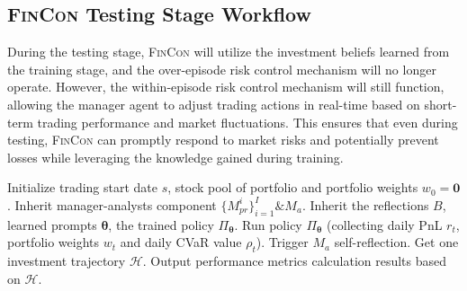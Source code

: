 
\newpage
\subsection{\textsc{FinCon} Testing Stage Workflow}
\label{Testing_Algo}
During the testing stage, \textsc{FinCon} will utilize the investment beliefs learned from the training stage, and the over-episode risk control mechanism will no longer operate. However, the within-episode risk control mechanism will still function, allowing the manager agent to adjust trading actions in real-time based on short-term trading performance and market fluctuations. This ensures that even during testing, \textsc{FinCon} can promptly respond to market risks and potentially prevent losses while leveraging the knowledge gained during training.

\label{alg:test_phase}
\begin{algorithm}[ht]
\caption{Testing Stage Algorithm of \textsc{FinCon}}
\begin{algorithmic}
\footnotesize{
\STATE Initialize trading start date $s$, stock pool of portfolio and portfolio weights $w_0=\textbf{0}$.
\STATE Inherit manager-analysts component $\{M_{pr}^i\}^{I}_{i=1} \& M_a$.
\STATE Inherit the reflections $B$, learned prompts $\bm{\theta}$, the trained policy $\Pi_{\bm{\theta}}$.
    \STATE Run policy $\Pi_{\bm{\theta}}$ (collecting daily PnL $r_t$, portfolio weights $w_t$ and daily CVaR value $\rho_t$).
        \STATE Trigger $M_a$ self-reflection.
    \ENDIF
    \STATE Get one investment trajectory $\mathcal{H}$.
\ENDFOR
\STATE Output performance metrics calculation results based on $\mathcal{H}$.
}
\end{algorithmic}
\end{algorithm}

